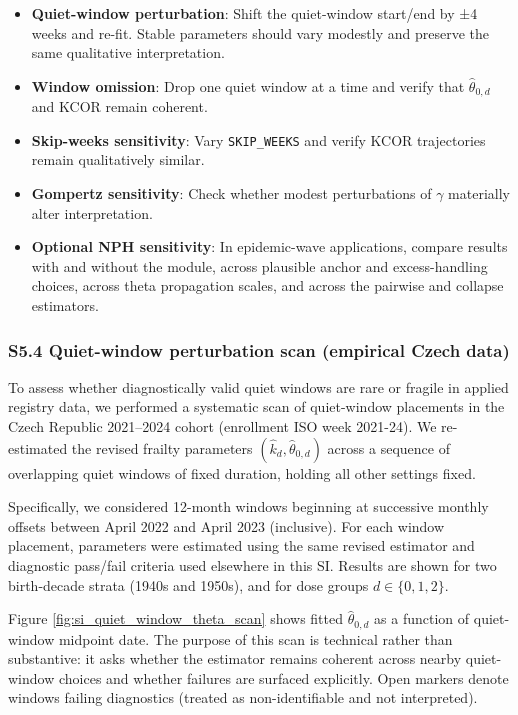 \documentclass[
]{article}
\providecommand{\tightlist}{%
  \setlength{\itemsep}{0pt}\setlength{\parskip}{0pt}}
\begin{document}
\begin{itemize}
\tightlist
\item
  \textbf{Quiet-window perturbation}: Shift the quiet-window start/end
  by ±4 weeks and re-fit. Stable parameters should vary modestly and
  preserve the same qualitative interpretation.
\item
  \textbf{Window omission}: Drop one quiet window at a time and verify
  that \(\hat{\theta}_{0,d}\) and KCOR remain coherent.
\item
  \textbf{Skip-weeks sensitivity}: Vary \texttt{SKIP\_WEEKS} and verify
  KCOR trajectories remain qualitatively similar.
\item
  \textbf{Gompertz sensitivity}: Check whether modest perturbations of
  \(\gamma\) materially alter interpretation.
\item
  \textbf{Optional NPH sensitivity}: In epidemic-wave applications,
  compare results with and without the module, across plausible anchor
  and excess-handling choices, across theta propagation scales, and
  across the pairwise and collapse estimators.
\end{itemize}

\subsubsection{S5.4 Quiet-window perturbation scan (empirical Czech
data)}\label{s5.4-quiet-window-perturbation-scan-empirical-czech-data}

To assess whether diagnostically valid quiet windows are rare or fragile
in applied registry data, we performed a systematic scan of quiet-window
placements in the Czech Republic 2021--2024 cohort (enrollment ISO week
2021-24). We re-estimated the revised frailty parameters
\((\hat{k}_d,\hat{\theta}_{0,d})\) across a sequence of overlapping
quiet windows of fixed duration, holding all other settings fixed.

Specifically, we considered 12-month windows beginning at successive
monthly offsets between April 2022 and April 2023 (inclusive). For each
window placement, parameters were estimated using the same revised
estimator and diagnostic pass/fail criteria used elsewhere in this SI.
Results are shown for two birth-decade strata (1940s and 1950s), and for
dose groups \(d \in \{0,1,2\}\).

Figure \ref{fig:si_quiet_window_theta_scan} shows fitted
\(\hat{\theta}_{0,d}\) as a function of quiet-window midpoint date. The
purpose of this scan is technical rather than substantive: it asks
whether the estimator remains coherent across nearby quiet-window
choices and whether failures are surfaced explicitly. Open markers
denote windows failing diagnostics (treated as non-identifiable and not
interpreted).
\end{document}
